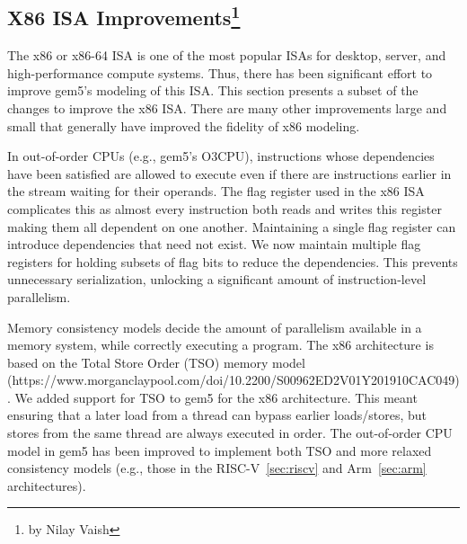 \subsection[X86 ISA Improvements]{X86 ISA Improvements\footnote{by Nilay Vaish}}

The x86 or x86-64 ISA is one of the most popular ISAs for desktop, server, and high-performance compute systems.
Thus, there has been significant effort to improve gem5's modeling of this ISA.
This section presents a subset of the changes to improve the x86 ISA.
There are many other improvements large and small that generally have improved the fidelity of x86 modeling.

In out-of-order CPUs (e.g., gem5's O3CPU), instructions whose dependencies have been satisfied are allowed to execute even if there are instructions earlier in the stream waiting for their operands.
The flag register used in the x86 ISA complicates this as almost every instruction both reads and writes this register making them all dependent on one another.
Maintaining a single flag register can introduce dependencies that need not exist.
We now maintain multiple flag registers for holding subsets of flag bits to reduce the dependencies.
This prevents unnecessary serialization, unlocking a significant amount of instruction-level parallelism.

Memory consistency models decide the amount of parallelism available in a memory system, while correctly executing a program.
The x86 architecture is based on the Total Store Order (TSO) memory model~\cite{coherenceprimer} (https://www.morganclaypool.com/doi/10.2200/S00962ED2V01Y201910CAC049).
We added support for TSO to gem5 for the x86 architecture.
This meant ensuring that a later load from a thread can bypass earlier loads/stores, but stores from the same thread are always executed in order.
The out-of-order CPU model in gem5 has been improved to implement both TSO and more relaxed consistency models (e.g., those in the RISC-V~\ref{sec:riscv} and Arm~\ref{sec:arm} architectures).
